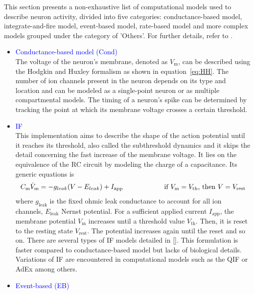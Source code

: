 This section presents a non-exhaustive list of computational models used to describe neuron activity, divided into five categories: conductance-based model, integrate-and-fire model, event-based model, rate-based model and more complex models grouped under the category of 'Others'. For further details, refer to \citep{gerstner_neuronal_2014}.



\begin{itemize}
\item \textcolor{blue}{Conductance-based model (Cond)}\\ 
The voltage of the neuron's membrane, denoted as $V_\mathrm{m}$, can be described using the Hodgkin and Huxley formalism \citep{hodgkin_quantitative_1952} as shown in equation~\eqref{eq:HH}. The number of ion channels present in the neuron depends on its type and location and can be modeled as a single-point neuron or as multiple compartmental models. The timing of a neuron's spike can be determined by tracking the point at which its membrane voltage crosses a certain threshold.
\item \textcolor{blue}{\acrfull{IF}} \\
This implementation aims to describe the shape of the action potential until it reaches its threshold, also called the subthreshold dynamics and it skips the detail concerning the fast increase of the membrane voltage. It lies on the equivalence of the RC circuit by modeling the charge of a capacitance. Its generic equations is
$$ C_\mathrm{m} \dot{V}_\mathrm{m} = - g_{leak} (V-E_{leak}) + I_{\mathrm{app}} \mbox{\hspace{2cm} if } V_\mathrm{m} = V_{\mathrm{th}} \mbox{, then } V = V_{\mathrm{rest}} $$
where $g_{\mathrm{leak}}$ is the fixed ohmic leak conductance to account  for all ion channels, $E_{\mathrm{leak}}$ Nernst potential. For a sufficient applied current $I_{\mathrm{app}}$, the membrane potential $V_\mathrm{m}$ increases until a threshold value $V_{\mathrm{th}}$. Then, it is reset to the resting state $V_{\mathrm{rest}}$. The potential increases again until the reset and so on. There are several types of \acrshort{IF} models detailed in [\cite{gerstner_neuronal_2014}]. This formulation is faster compared to conductance-based model but lacks of biological details. Variations of \acrshort{IF} are encountered in computational models such as the \acrfull{QIF} or \acrfull{AdEx} among others.
\item \textcolor{blue}{Event-based (EB)}\\

\end{itemize}
